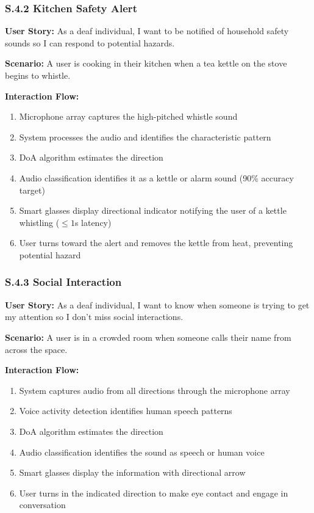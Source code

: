 \documentclass[12pt]{article}
\theoremstyle{definition}
\begin{document}
\subsubsection{S.4.2 Kitchen Safety Alert}
\textbf{User Story:} As a deaf individual, I want to be notified of household safety sounds so I can respond to potential hazards.

\textbf{Scenario:} A user is cooking in their kitchen when a tea kettle on the stove begins to whistle.

\textbf{Interaction Flow:}
\begin{enumerate}
    \item Microphone array captures the high-pitched whistle sound
    \item System processes the audio and identifies the characteristic pattern
    \item DoA algorithm estimates the direction
    \item Audio classification identifies it as a kettle or alarm sound (90\% accuracy target)
    \item Smart glasses display directional indicator notifying the user of a kettle whistling ($\leq 1$s latency)
    \item User turns toward the alert and removes the kettle from heat, preventing potential hazard
\end{enumerate}

\subsubsection{S.4.3 Social Interaction}
\textbf{User Story:} As a deaf individual, I want to know when someone is trying to get my attention so I don't miss social interactions.

\textbf{Scenario:} A user is in a crowded room when someone calls their name from across the space.

\textbf{Interaction Flow:}
\begin{enumerate}
    \item System captures audio from all directions through the microphone array
    \item Voice activity detection identifies human speech patterns
    \item DoA algorithm estimates the direction
    \item Audio classification identifies the sound as speech or human voice
    \item Smart glasses display the information with directional arrow
    \item User turns in the indicated direction to make eye contact and engage in conversation
\end{enumerate}
\end{document}
